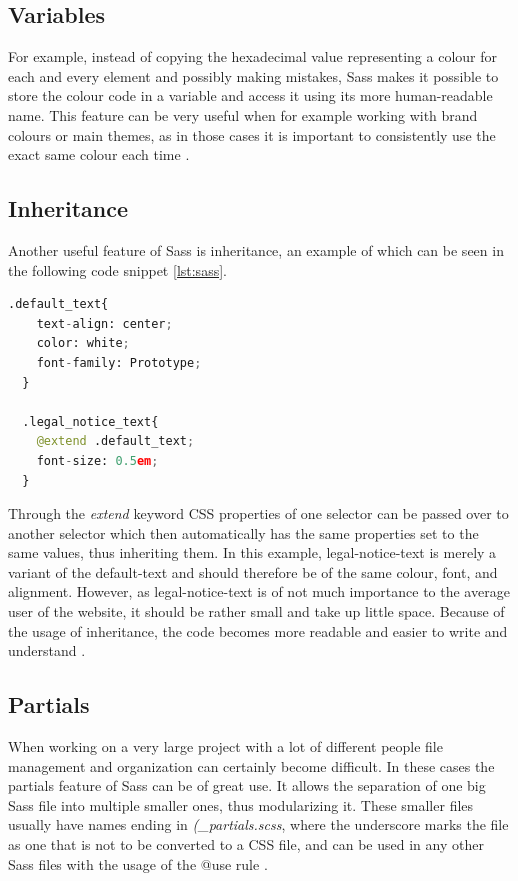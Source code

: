 \subsection{Variables}
For example, instead of copying the hexadecimal value representing a colour for each and every element and possibly making mistakes, Sass makes it possible
to store the colour code in a variable and access it using its more human-readable name. This feature can be very useful when for example working with brand
colours or main themes, as in those cases it is important to consistently use the exact same colour each time \cite{SassFeatures}.

\subsection{Inheritance}
Another useful feature of Sass is inheritance, an example of which can be seen in the following code snippet \ref{lst:sass}.

\begin{lstlisting}[language=Python,caption=Textstyling in Sass,label=lst:sass]
  .default_text{
    text-align: center;
    color: white;
    font-family: Prototype;
  }

  .legal_notice_text{
    @extend .default_text;
    font-size: 0.5em;
  }
\end{lstlisting}

Through the \emph{extend} keyword CSS properties of one selector can be passed over to another selector which then automatically has the 
same properties set to the same values, thus inheriting them. In this example, legal-notice-text is merely a variant of the 
default-text and should therefore be of the same colour, font, and alignment. However, as legal-notice-text is of not much 
importance to the average user of the website, it should be rather small and take up little space. Because of the usage of 
inheritance, the code becomes more readable and easier to write and understand \cite{SassFeatures}.

\subsection{Partials}
When working on a very large project with a lot of different people file management and organization can certainly become difficult. In
these cases the partials feature of Sass can be of great use. It allows the separation of one big Sass file into multiple smaller ones,
thus modularizing it. These smaller files usually have names ending in \emph{(\_partials.scss}, where the underscore marks the file as one
that is not to be converted to a CSS file, and can be used in any other Sass files with the usage of the @use rule \cite{SassFeatures}.

